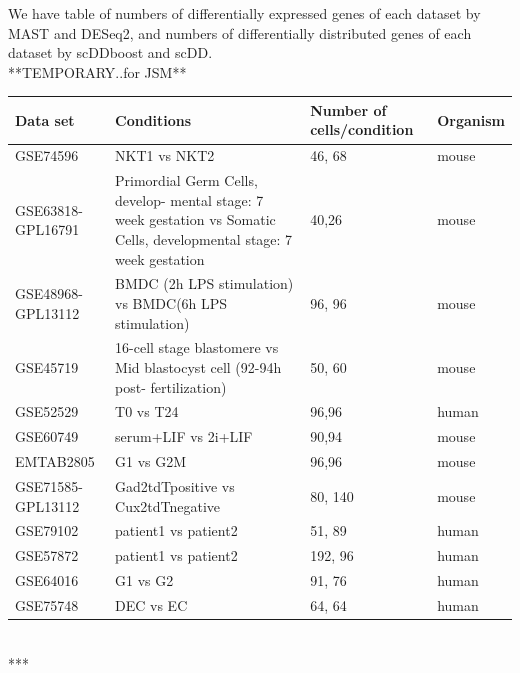 \documentclass[11pt]{amsart}
\begin{document}
We have table of numbers of differentially expressed genes of each dataset by MAST and DESeq2, and numbers of differentially distributed genes of each dataset by scDDboost and scDD.\\

**TEMPORARY..for JSM**

\begin{table}[ht]
\small
\centering
\begin{tabular}{ |p{3cm}|p{5cm}|p{3cm}|p{1.5cm}|}
\hline
 Data set & Conditions & Number of cells/condition & Organism \\
 \hline
 \hline
 GSE74596 & NKT1 vs NKT2 & 46, 68 & mouse  \\
 \hline
 GSE63818-GPL16791 & Primordial Germ Cells, develop- mental stage: 7 week gestation vs Somatic Cells, developmental stage: 7 week gestation & 40,26 & mouse  \\
 \hline
 GSE48968-GPL13112 & BMDC (2h LPS stimulation) vs BMDC(6h LPS stimulation) & 96, 96 & mouse \\
 \hline
 GSE45719 & 16-cell stage blastomere vs Mid blastocyst cell (92-94h post- fertilization) & 50, 60 & mouse \\
 \hline
 GSE52529 & T0 vs T24 & 96,96 & human \\
 \hline
 GSE60749 & serum+LIF vs 2i+LIF & 90,94 & mouse\\
 \hline
 EMTAB2805 & G1 vs G2M & 96,96 & mouse \\
 \hline
 GSE71585-GPL13112 & Gad2tdTpositive vs Cux2tdTnegative & 80, 140 & mouse \\
 \hline
 GSE79102 & patient1 vs patient2 & 51, 89 & human\\
 \hline
 GSE57872 & patient1 vs patient2 & 192, 96 & human\\
 \hline
 GSE64016 & G1 vs G2 & 91, 76 & human\\
 \hline
GSE75748 & DEC vs EC & 64, 64 & human \\
\hline
\end{tabular}
\end{table}
\hfill\\

***
\end{document}
